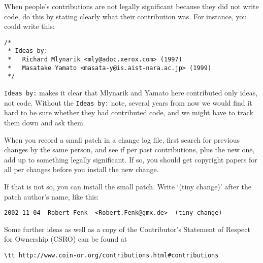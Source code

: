 When people’s contributions are not legally significant because they did not write code, do this by stating clearly what their contribution was. For instance, you could write this:
 
\begin{verbatim}
/*
 * Ideas by:
 *   Richard Mlynarik <mly@adoc.xerox.com> (1997)
 *   Masatake Yamato <masata-y@is.aist-nara.ac.jp> (1999)
 */
\end{verbatim}

{\tt Ideas by:} makes it clear that Mlynarik and Yamato here contributed only ideas, not code. 
Without the {\tt Ideas by:} note, several years from now we would find it hard to be sure whether they had contributed code, and we might have to track them down and ask them.
 
When you record a small patch in a change log file, first search for previous changes by the same person, and see if per past contributions, plus the new one, add up to something legally significant. If so, you should get copyright papers for all per changes before you install the new change.
 
If that is not so, you can install the small patch. Write ‘(tiny change)’ after the patch author’s name, like this:
 
\begin{verbatim}
2002-11-04  Robert Fenk  <Robert.Fenk@gmx.de>  (tiny change)
\end{verbatim}

\medskip

Some further ideas as well as a copy of the Contributor's Statement of Respect for Ownership (CSRO)
can be found at %
\begin{verbatim}
\tt http://www.coin-or.org/contributions.html#contributions
\end{verbatim}